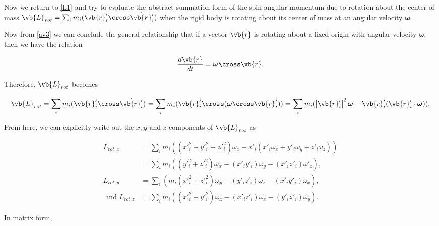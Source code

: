 \documentclass[a4paper,12pt]{report}
\begin{document}
Now we return to \cref{L1} and try to evaluate the abstract summation form of the spin angular momentum due to rotation about the center of mass \(\vb{L} _{rot} = \sum_{i}^{} m_{i} (\vb{r} '_{i} \cross \dot{\vb{r} '_{i} } )  \) when the rigid body is rotating about its center of mass at an angular velocity \(\boldsymbol{\omega } \).

Now from \cref{av3} we can conclude the general relationship that if a vector \(\vb{r} \)  is rotating about a fixed origin with angular velocity \(\boldsymbol{\omega } \), then we have the relation 

\begin{equation}
	\frac{d \vb{r}}{dt} =  \boldsymbol{\omega } \cross \vb{r} . \label{rotchange}  
\end{equation}

Therefore, \(\vb{L} _{rot} \)  becomes

\begin{equation}
	\vb{L} _{rot} = \sum_{i}^{} m_{i} (\vb{r} '_{i} \cross \dot{\vb{r} '_{i} } ) = \sum_{i}^{} m_{i} (\vb{r} '_{i} \cross (\boldsymbol{\omega } \cross \vb{r} '_{i}) ) = \sum_{i}^{} m_{i} (\left| \vb{r} '_{i}  \right| ^2 \boldsymbol{\omega } - \vb{r} '_{i} (\vb{r} '_{i} \cdot \boldsymbol{\omega } )). 
\end{equation}

From here, we can explicitly write out the \(x,y \text{ and } z\) components of \(\vb{L} _{rot} \) as

\begin{equation}
	\begin{aligned}
		L_{rot,x} &= \sum_{i}^{} m_{i} ((x'^2_i + y'^2_i + z'^2_i)\omega  _{x} - x'_{i} (x'_{i} \omega _{x} + y'_{i} \omega _{y} + z'_{i} \omega _{z} )) \\ 
		      &= \sum_{i}^{} m_{i} ((y'^2_i + z'^2_i)\omega _{x} - (x'_{i} y'_{i} )\omega _{y} - (x'_{i} z'_{i}) \omega '_{z}) , \\ 
		L_{rot,y} &= \sum_{i}^{} (m_{i} (x'^2_i + z'^2_i)\omega _{y} - (y'_{i} z'_{i} )\omega _{z} - (x'_{i} y'_{i} )\omega _{x}), \\ 
		\text{ and }  L_{rot,z} &= \sum_{i}^{} m_{i} ((x'^2_i + y'^2_i) \omega _{z} - (x'_{i} z'_{i} )\omega _{x} - (y'_{i} z'_{i} )\omega _{y}) . 
	\end{aligned}
\end{equation}

In matrix form, 
\end{document}
